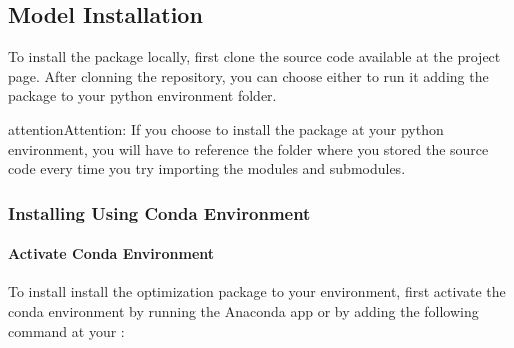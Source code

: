 \documentclass[letterpaper,10pt,english]{sphinxmanual}
\begin{document}
\subsection{Model Installation}
\label{\detokenize{source/guides:model-installation}}
To install the {\hyperref[\detokenize{source/optimization:module-optimization}]{}} package locally, first clone the source code available at the project  page.
After clonning the repository, you can choose either to run it  adding the package to your python environment  folder.

\begin{sphinxadmonition}{attention}{Attention:}
If you choose  to install the package at your python environment, you will have to reference the folder where you stored the source
code every time you try importing the {\hyperref[\detokenize{source/optimization:module-optimization}]{}} modules and submodules.
\end{sphinxadmonition}


\subsubsection{Installing Using Conda Environment}
\label{\detokenize{source/guides:installing-using-conda-environment}}

\paragraph{Activate Conda Environment}
\label{\detokenize{source/guides:activate-conda-environment}}
To install install the optimization package to your  environment, first activate the conda environment by running the Anaconda app or by adding
the following command at your :
\def\sphinxLiteralBlockLabel{\label{\detokenize{source/guides:id1}}}
\begin{sphinxVerbatim}[commandchars=\\\{\},numbers=left,firstnumber=1,stepnumber=1]
\end{sphinxVerbatim}
\end{document}
